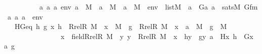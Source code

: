 \begin{isabellebody}
\ \ \ \ \ \ \ \ \ \ {\isachardoublequoteopen}{\isasymAnd}a{}\ a{}\ a{}\ env{\isachardot}{\kern0pt}\ a{}\ {\isasymin}\ M\ {\isasymLongrightarrow}\ a{}\ {\isasymin}\ M\ {\isasymLongrightarrow}\ a{}\ {\isasymin}\ M\ {\isasymLongrightarrow}\ env\ {\isasymin}\ list{\isacharparenleft}{\kern0pt}M{\isacharparenright}{\kern0pt}\ {\isasymLongrightarrow}\ a{}\ {\isacharequal}{\kern0pt}\ G{\isacharparenleft}{\kern0pt}a{}{\isacharcomma}{\kern0pt}\ a{}{\isacharparenright}{\kern0pt}\ {\isasymlongleftrightarrow}\ sats{\isacharparenleft}{\kern0pt}M{\isacharcomma}{\kern0pt}\ Gfm{\isacharcomma}{\kern0pt}\ {\isacharbrackleft}{\kern0pt}a{}{\isacharcomma}{\kern0pt}\ a{}{\isacharcomma}{\kern0pt}\ a{}{\isacharbrackright}{\kern0pt}\ {\isacharat}{\kern0pt}\ env{\isacharparenright}{\kern0pt}{\isachardoublequoteclose}\ \ \isanewline
\ \ \ HGeq{\isacharcolon}{\kern0pt}\ {\isachardoublequoteopen}{\isasymAnd}h\ g\ x{\isachardot}{\kern0pt}\ h\ {\isasymin}\ Rrel{\isacharparenleft}{\kern0pt}R{\isacharcomma}{\kern0pt}\ M{\isacharparenright}{\kern0pt}\ {\isacharminus}{\kern0pt}{\isacharbackquote}{\kern0pt}{\isacharbackquote}{\kern0pt}\ {\isacharbraceleft}{\kern0pt}x{\isacharbraceright}{\kern0pt}\ {\isasymrightarrow}\ M\ {\isasymLongrightarrow}\ g\ {\isasymin}\ {\isacharparenleft}{\kern0pt}Rrel{\isacharparenleft}{\kern0pt}R{\isacharcomma}{\kern0pt}\ M{\isacharparenright}{\kern0pt}\ {\isacharminus}{\kern0pt}{\isacharbackquote}{\kern0pt}{\isacharbackquote}{\kern0pt}\ {\isacharbraceleft}{\kern0pt}x{\isacharbraceright}{\kern0pt}\ {\isasymtimes}\ {\isacharbraceleft}{\kern0pt}a{\isacharbraceright}{\kern0pt}{\isacharparenright}{\kern0pt}\ {\isasymrightarrow}\ M\ {\isasymLongrightarrow}\ g\ {\isasymin}\ M\ \ \isanewline
\ \ \ \ \ \ \ \ \ \ \ \ \ \ \ {\isasymLongrightarrow}\ x\ {\isasymin}\ field{\isacharparenleft}{\kern0pt}Rrel{\isacharparenleft}{\kern0pt}R{\isacharcomma}{\kern0pt}\ M{\isacharparenright}{\kern0pt}{\isacharparenright}{\kern0pt}\ {\isasymLongrightarrow}\ {\isacharparenleft}{\kern0pt}{\isasymAnd}y{\isachardot}{\kern0pt}\ y\ {\isasymin}\ Rrel{\isacharparenleft}{\kern0pt}R{\isacharcomma}{\kern0pt}\ M{\isacharparenright}{\kern0pt}\ {\isacharminus}{\kern0pt}{\isacharbackquote}{\kern0pt}{\isacharbackquote}{\kern0pt}\ {\isacharbraceleft}{\kern0pt}x{\isacharbraceright}{\kern0pt}\ {\isasymLongrightarrow}\ h{\isacharbackquote}{\kern0pt}y\ {\isacharequal}{\kern0pt}\ g{\isacharbackquote}{\kern0pt}{\isacharless}{\kern0pt}y{\isacharcomma}{\kern0pt}\ a{\isachargreater}{\kern0pt}{\isacharparenright}{\kern0pt}\ {\isasymLongrightarrow}\ H{\isacharparenleft}{\kern0pt}x{\isacharcomma}{\kern0pt}\ h{\isacharparenright}{\kern0pt}\ {\isacharequal}{\kern0pt}\ G{\isacharparenleft}{\kern0pt}{\isacharless}{\kern0pt}x{\isacharcomma}{\kern0pt}\ a{\isachargreater}{\kern0pt}{\isacharcomma}{\kern0pt}\ g{\isacharparenright}{\kern0pt}{\isachardoublequoteclose}\ \ \isanewline

\end{isabellebody}
